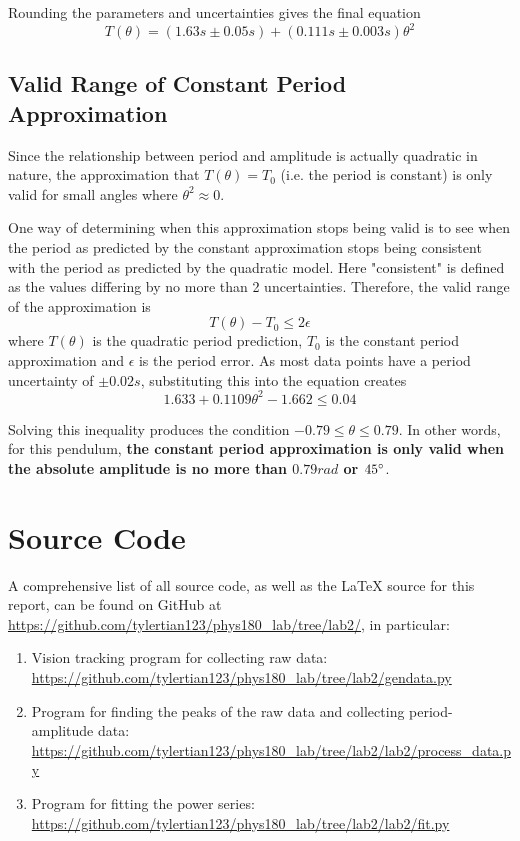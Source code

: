 \documentclass[aps,twocolumn,secnumarabic,nobalancelastpage,amsmath,amssymb,nofootinbib,floatfix]{revtex4}
\begin{document}
Rounding the parameters and uncertainties gives the final equation
\begin{equation}
    T(\theta) = (1.63\si{s} \pm 0.05\si{s}) + (0.111\si{s} \pm 0.003\si{s})\theta^2
\end{equation}

\subsection{Valid Range of Constant Period Approximation}

Since the relationship between period and amplitude is actually quadratic in nature, the approximation that
$T(\theta) = T_0$ (i.e. the period is constant) is only valid for small angles where $\theta^2 \approx 0$.

One way of determining when this approximation stops being valid is to see when the period as predicted by the constant
approximation stops being consistent with the period as predicted by the quadratic model. Here "consistent" is defined
as the values differing by no more than 2 uncertainties. Therefore, the valid range of the approximation is
\begin{equation}
    T(\theta) - T_0 \leq 2\epsilon
\end{equation}
where $T(\theta)$ is the quadratic period prediction, $T_0$ is the constant period approximation and $\epsilon$ is the
period error. As most data points have a period uncertainty of $\pm 0.02\si{s}$, substituting this into the equation creates
\begin{equation}
    1.633 + 0.1109\theta^2 - 1.662 \leq 0.04
\end{equation}

Solving this inequality produces the condition $-0.79 \leq \theta \leq 0.79$. In other words, for this pendulum,
\textbf{the constant period approximation is only valid when the absolute amplitude is no more than $0.79\si{rad}$ or
$45\degree$}.


\appendix

\section{Source Code}

A comprehensive list of all source code, as well as the \LaTeX{} source for this report, can be found on GitHub at
\url{https://github.com/tylertian123/phys180_lab/tree/lab2/}, in particular:
\label{appendix:code}
\begin{enumerate}
    \item Vision tracking program for collecting raw data: \url{https://github.com/tylertian123/phys180_lab/tree/lab2/gendata.py}
    \item Program for finding the peaks of the raw data and collecting period-amplitude data: \url{https://github.com/tylertian123/phys180_lab/tree/lab2/lab2/process_data.py}
    \item Program for fitting the power series: \url{https://github.com/tylertian123/phys180_lab/tree/lab2/lab2/fit.py}
\end{enumerate}
\end{document}
